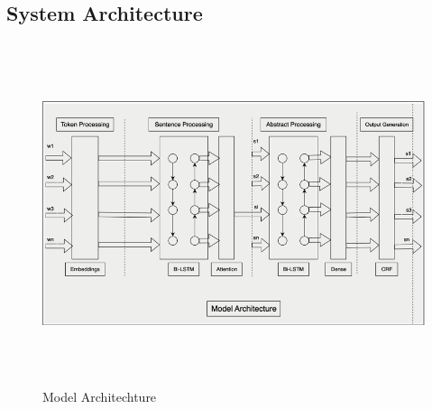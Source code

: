 \documentclass[12pt,a4paper]{report}     %
\begin{document}
\begin{normalsize}
\newpage 
\chapter{}
{\setlength{\baselineskip}{1.1\baselineskip}

\section{System Architecture}
{\setlength{\baselineskip}{1.1\baselineskip}

\begin{figure}[h]
  \centering
  \includegraphics[width=16cm,height=10cm]{Model Architecture.png}
  \caption{Model Architechture}
  \label{fig:architectural}
\end{figure}

}}
\end{normalsize}
\end{document}
